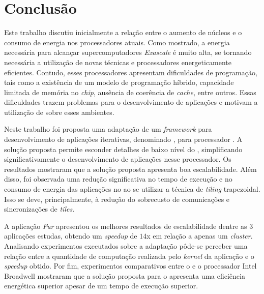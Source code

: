 \chapter{Conclusão}
\label{cha:conclusao}
Este trabalho discutiu inicialmente a relação entre o aumento de núcleos e o consumo de
energia nos processadores atuais. Como mostrado, a energia necessária para alcançar supercomputadores
\textit{Exascale} é muito alta, se tornando necessária a utilização de
novas técnicas e processadores energeticamente eficientes. Contudo, esses
processadores apresentam dificuldades de programação, tais como a existência de
um modelo de programação híbrido, capacidade limitada de memória no
\textit{chip}, ausência de coerência de \textit{cache}, entre outros. Essas
dificuldades trazem problemas para o desenvolvimento
de aplicações e motivam a utilização de \fws sobre esses ambientes.


Neste trabalho foi proposta uma adaptação de um \textit{framework} para
desenvolvimento de aplicações \stencil iterativas, denominado \pskel, para
processador \mppa. A solução proposta permite esconder detalhes de baixo nível
do \mppa, simplificando significativamente o desenvolvimento de aplicações
\stencil nesse processador. Os resultados mostraram que a solução proposta
apresenta boa escalabilidade. Além disso, foi observada uma redução
significativa no tempo de execução e no consumo de energia das aplicações no
\mppa ao se utilizar a técnica de \textit{tiling} trapezoidal. Isso se deve,
principalmente, à redução do sobrecusto de comunicações e sincronizações de
\textit{tiles}.

A aplicação \textit{Fur} apresentou os melhores resultados de escalabilidade
dentre as 3 aplicações estudas, obtendo um \textit{speedup} de $14$x em relação
a apenas um \textit{cluster}. Analisando experimentos executados sobre a
adaptação pôde-se perceber uma relação entre a quantidade de computação
realizada pelo \textit{kernel} da aplicação e o \textit{speedup} obtido. Por
fim, experimentos comparativos entre o \mppa e o processador Intel Broadwell
mostraram que a solução proposta para o \mppa apresenta uma eficiência
energética superior apesar de um tempo de execução superior.

